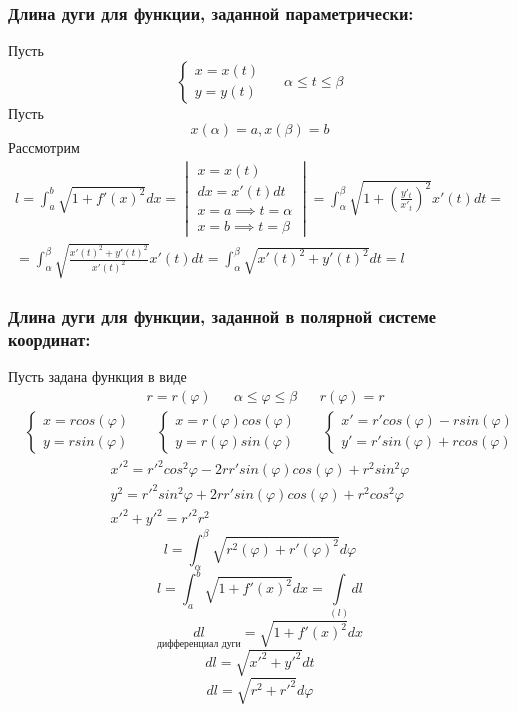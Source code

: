 \documentclass[12pt]{article}
\begin{document}
    \subsubsection*{Длина дуги для функции, заданной параметрически:}\noindent
    Пусть
    \[ \begin{cases}
        x=x(t)\\
        y=y(t)
    \end{cases} \;\;\;\;\; \alpha \leq t \leq \beta \]
    Пусть
    \[ x(\alpha)=a, x(\beta)=b \]
    Рассмотрим
    \begin{gather*}
        l=\int_{a}^{b} \sqrt{1+f'(x)^2}dx=
        \begin{vmatrix}
            x=x(t)\\
            dx=x'(t)dt\\
            x=a \implies t=\alpha\\
            x=b \implies t= \beta
        \end{vmatrix}=\int_{\alpha}^{\beta} \sqrt{1+(\frac{y'_t}{x'_t})^2}x'(t)dt =\\
        = \int_{\alpha}^{\beta} \sqrt{\frac{x'(t)^2+y'(t)^2}{x'(t)^2}}x'(t)dt = \boxed{ \int_{\alpha}^{\beta}\sqrt{x'(t)^2+y'(t)^2}dt = l }
    \end{gather*}
    \subsubsection*{Длина дуги для функции, заданной в полярной системе координат:}\noindent
    Пусть задана функция в виде
    \begin{align*}
        &r=r(\varphi) & &\alpha \leq \varphi \leq \beta & &r(\varphi)=r
    \end{align*}
    \begin{align*}
        &\begin{cases}
            x=rcos(\varphi)\\
            y=rsin(\varphi)
        \end{cases} & 
        &\begin{cases}
            x=r(\varphi)cos(\varphi)\\
            y=r(\varphi)sin(\varphi)
        \end{cases} & 
        &\begin{cases}
            x'=r'cos(\varphi)-rsin(\varphi)\\
            y'=r'sin(\varphi)+rcos(\varphi)
        \end{cases}
    \end{align*}
    \begin{gather*}
        x'^2=r'^2cos^2\varphi-2rr'sin(\varphi) cos(\varphi)+r^2sin^2\varphi\\
        y^2=r'^2sin^2\varphi+2rr'sin(\varphi) cos(\varphi) + r^2cos^2\varphi\\
        x'^2+y'^2=r'^2r^2
    \end{gather*}
    \[ \boxed{ l=\int_{\alpha}^{\beta} \sqrt{r^2(\varphi)+r'(\varphi)^2}d\varphi } \]
    \[ l=\int_{a}^{b}\sqrt{1+f'(x)^2}dx=\underset{(l)}{\int}dl \]
    \[ \underset{\text{дифференциал дуги}}{dl} = \sqrt{1+f'(x)^2}dx \]
    \[ dl=\sqrt{x'^2+y'^2}dt \]
    \[ dl=\sqrt{r^2+r'^2}d\varphi \]
\end{document}
